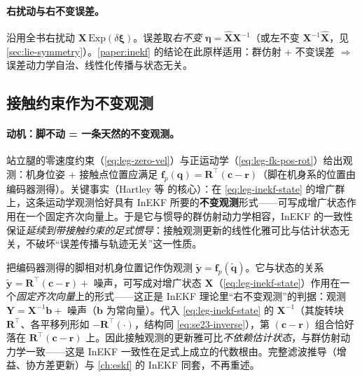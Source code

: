 \paragraph{右扰动与右不变误差。}
沿用全书右扰动 $\mathbf{X}\,\mathrm{Exp}(\delta\boldsymbol{\xi})$。误差取\emph{右不变} $\boldsymbol{\eta}=\hat{\mathbf{X}}\mathbf{X}^{-1}$（或左不变 $\mathbf{X}^{-1}\hat{\mathbf{X}}$，见 \cref{sec:lie-symmetry}）。\cref{paper:inekf} 的结论在此原样适用：群仿射 + 不变误差 $\Rightarrow$ 误差动力学自治、线性化传播与状态无关。

\subsection{接触约束作为不变观测}
\label{subsec:leg-inekf-meas}

\paragraph{动机：脚不动 = 一条天然的不变观测。}
站立腿的零速度约束（\cref{eq:leg-zero-vel}）与正运动学（\cref{eq:leg-fk-pos-rot}）给出观测：机身位姿 + 接触点位置应满足 $\mathbf{f}_p(\mathbf{q})=\mathbf{R}^\top(\mathbf{c}-\mathbf{r})$（脚在机身系的位置由编码器测得）。关键事实（Hartley 等\cite{hartley2020contact} 的核心）：在 \cref{eq:leg-inekf-state} 的增广群上，这条运动学观测恰好具有 InEKF 所要的\textbf{不变观测}形式——可写成增广状态作用在一个固定齐次向量上。于是它与惯导的群仿射动力学相容，InEKF 的一致性保证\emph{延续到带接触约束的足式惯导}：接触观测更新的线性化雅可比与估计状态无关，不破坏“误差传播与轨迹无关”这一性质。

\begin{derivation}[接触观测为何保持群结构（要点）]
把编码器测得的脚相对机身位置记作伪观测 $\tilde{\mathbf{y}}=\mathbf{f}_p(\tilde{\mathbf{q}})$。它与状态的关系 $\tilde{\mathbf{y}}=\mathbf{R}^\top(\mathbf{c}-\mathbf{r})+$ 噪声，可写成对增广状态 $\mathbf{X}$（\cref{eq:leg-inekf-state}）作用在一个\emph{固定齐次向量}上的形式——这正是 InEKF 理论里“右不变观测”的判据：观测 $\mathbf{Y}=\mathbf{X}^{-1}\mathbf{b}+$ 噪声（$\mathbf{b}$ 为常向量）。代入 \cref{eq:leg-inekf-state} 的 $\mathbf{X}^{-1}$（其旋转块 $\mathbf{R}^\top$、各平移列形如 $-\mathbf{R}^\top(\cdot)$，结构同 \cref{eq:se23-inverse}），第 $(\mathbf{c}-\mathbf{r})$ 组合恰好落在 $\mathbf{R}^\top(\mathbf{c}-\mathbf{r})$ 上。因此接触观测的更新雅可比\emph{不依赖估计状态}，与群仿射动力学一致——这是 InEKF 一致性在足式上成立的代数根由。完整滤波推导（增益、协方差更新）与 \cref{ch:eskf} 的 InEKF 同套，不再重述。
\end{derivation}

